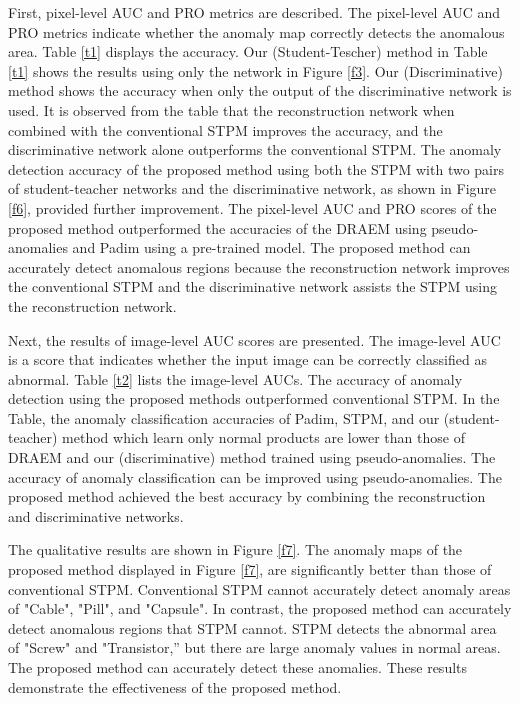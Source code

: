 \documentclass[letterpaper, 10 pt, conference]{ieeeconf}
\begin{document}
First, pixel-level AUC and PRO metrics are described. The pixel-level AUC and PRO metrics indicate whether the anomaly map correctly detects the anomalous area. Table \ref{t1} displays the accuracy. Our (Student-Tescher) method in Table \ref{t1} shows the results using only the network in Figure \ref{f3}. Our (Discriminative) method shows the accuracy when only the output  of the discriminative network is used. It is observed from the table that the reconstruction network when combined with the conventional STPM improves the accuracy, and the discriminative network alone outperforms the conventional STPM. The anomaly detection accuracy of the proposed method using both the STPM with two pairs of student-teacher networks and the discriminative network, as shown in Figure \ref{f6}, provided further improvement. The pixel-level AUC and PRO scores of the proposed method outperformed the accuracies of the DRAEM using pseudo-anomalies and Padim using a pre-trained model. The proposed method can accurately detect anomalous regions because the reconstruction network improves the conventional STPM and the discriminative network assists the STPM using the reconstruction network. 

Next, the results of image-level AUC scores are presented. The image-level AUC is a score that indicates whether the input image can be correctly classified as abnormal. Table \ref{t2} lists the image-level AUCs. The accuracy of anomaly detection using the proposed methods outperformed conventional STPM. In the Table, the anomaly classification accuracies of Padim, STPM, and our (student-teacher) method which learn only normal products are lower than those of DRAEM and our (discriminative) method trained using pseudo-anomalies. The accuracy of anomaly classification can be improved using pseudo-anomalies. The proposed method achieved the best accuracy by combining the reconstruction and discriminative networks.

The qualitative results are shown in Figure \ref{f7}. The anomaly maps of the proposed method displayed in Figure \ref{f7}, are significantly better than those of conventional STPM. Conventional STPM cannot accurately detect anomaly areas of "Cable", "Pill", and "Capsule". In contrast, the proposed method can accurately detect anomalous regions that STPM cannot. STPM detects the abnormal area of "Screw" and "Transistor,” but there are large anomaly values in normal areas. The proposed method can accurately detect these anomalies. These results demonstrate the effectiveness of the proposed method. 
\end{document}
